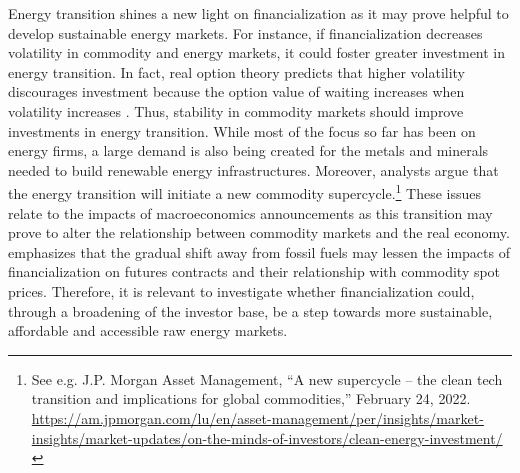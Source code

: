 \documentclass[12pt]{article}
\begin{document}
Energy transition shines a new light on financialization as it may prove  helpful to develop sustainable energy markets.
For instance, if financialization decreases volatility in commodity and energy markets, it could foster greater investment in energy transition. In fact, real option theory predicts that higher volatility discourages investment because the option value of waiting increases when volatility increases \citep{kellogg2014effect}.  Thus,  stability in commodity markets should improve investments in  energy  transition. While most of the focus so far has been  on energy firms, a large demand is also being created for the metals and minerals needed to build renewable energy infrastructures.
Moreover, analysts argue that the energy transition will initiate a new commodity supercycle.\footnote{See e.g. J.P. Morgan Asset Management, ``A new supercycle – the clean tech transition and implications for global commodities,'' February 24, 2022. \url{https://am.jpmorgan.com/lu/en/asset-management/per/insights/market-insights/market-updates/on-the-minds-of-investors/clean-energy-investment/}}  
These issues relate to the impacts of macroeconomics announcements as this transition may prove to alter the relationship between commodity markets and the real economy. \citet{knuth2018breakthroughs} emphasizes that the gradual shift away from fossil fuels may lessen the impacts of financialization on futures contracts and their relationship with commodity spot prices. Therefore, it is relevant to investigate whether financialization could, through a broadening of the investor base, be a step towards more sustainable, affordable and accessible raw energy markets.


%
\end{document}
